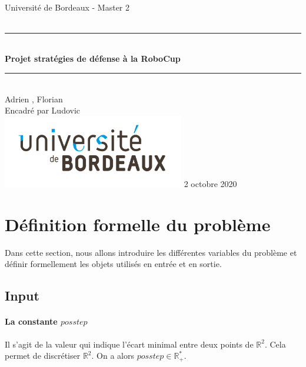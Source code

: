 \documentclass[12pt]{article}
\begin{document}
\begin{titlepage}
    ~ \vfill
    \begin{center}
      \LARGE  Université de Bordeaux - Master 2\\[1.5cm]

      {\Large \bfseries {}}\\[0.5cm]

      \rule{\linewidth}{0.5mm}\\[0.4cm] {\Huge \bfseries Projet stratégies de défense à la RoboCup \\[0.2cm]} \rule{\linewidth}{0.5mm}\\[1.5cm] {
      \Large Adrien , Florian }\\[0.5cm]

                {\large Encadré par Ludovic }\\ \vfill
                \includegraphics[width = 300px]{logo.jpg} \vfill
                                {\large 2 octobre 2020}
    \end{center}
\end{titlepage}

\section{Définition formelle du problème}

Dans cette section, nous allons introduire les différentes variables du problème et définir formellement les objets utilisés en entrée et en sortie.

\subsection{Input}

\paragraph{La constante $posstep$} Il s'agit de la valeur qui indique l'écart minimal entre deux points de $\mathbb{R}^2$. Cela permet de discrétiser $\mathbb{R}^2$. On a alors $posstep \in \mathbb{R}^*_+$.
\end{document}
